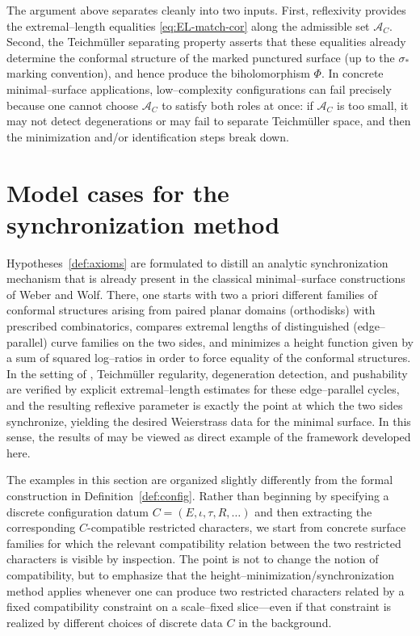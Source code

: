 \documentclass[a4paper,12pt]{amsart}
\theoremstyle{plain}
\theoremstyle{definition}
\begin{document}
The argument above separates cleanly into two inputs.
First, reflexivity provides the extremal--length equalities \eqref{eq:EL-match-cor} along the admissible set $\mathcal A_C$.
Second, the Teichm\"uller separating property asserts that these equalities already determine the conformal structure of the
marked punctured surface (up to the $\sigma_\ast$ marking convention), and hence produce the biholomorphism $\Phi$.
In concrete minimal--surface applications, low--complexity configurations can fail precisely because one cannot choose
$\mathcal A_C$ to satisfy both roles at once: if $\mathcal A_C$ is too small, it may not detect degenerations or may fail to
separate Teichm\"uller space, and then the minimization and/or identification steps break down.



\section{Model cases for the synchronization method}\label{sec:examples}


Hypotheses~\ref{def:axioms} are formulated to distill an analytic synchronization mechanism
that is already present in the classical minimal--surface constructions of Weber and Wolf.
There, one starts with two {a priori} different families of conformal structures arising from paired
planar domains (orthodisks) with prescribed combinatorics, compares extremal lengths of distinguished
(edge--parallel) curve families on the two sides, and minimizes a {height} function given by a sum of
squared log--ratios in order to force equality of the conformal structures.  In the setting of
\cite{WeberWolfGAFA,WeberWolfAnnals}, Teichm\"uller regularity, degeneration detection, and pushability are
verified by explicit extremal--length estimates for these edge--parallel cycles, and the resulting reflexive
parameter is exactly the point at which the two sides synchronize, yielding the desired Weierstrass data for
the minimal surface.  In this sense, the results of
\cite{WeberWolfGAFA,WeberWolfAnnals,BardhanBiswasFujimoriKumarAngel,BardhanBiswasKumarMaxfaces}
may be viewed as direct example of the framework developed here.

\medskip
The examples in this section are organized slightly differently from the formal construction
in Definition~\ref{def:config}.  Rather than beginning by specifying a discrete configuration datum
\(C=(E,\iota,\tau,R,\dots)\) and then extracting the corresponding \(C\)-compatible restricted characters, we
start from concrete surface families for which the relevant compatibility relation between the two restricted
characters is visible by inspection.  The point is not to change the notion of compatibility, but to
emphasize that the height--minimization/synchronization method applies whenever one can produce
two restricted characters related by a fixed compatibility constraint on a scale--fixed slice---even if that
constraint is realized by different choices of discrete data \(C\) in the background.
\end{document}
